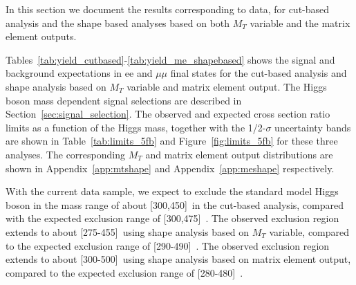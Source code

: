 In this section we document the results corresponding to \intlumi data, for 
cut-based analysis and the shape based analyses based on both 
$M_T$ variable and the matrix element outputs. 

Tables~\ref{tab:yield_cutbased}-\ref{tab:yield_me_shapebased} shows the signal and background expectations 
in ee and $\mu\mu$ final states for the cut-based analysis and shape analysis based on $M_T$ variable 
and matrix element output. The Higgs boson mass dependent signal selections are described in Section~\ref{sec:signal_selection}.
The observed and expected cross section ratio limits as a function of the Higgs mass, together with the 1/2-$\sigma$ uncertainty bands 
are shown in Table~\ref{tab:limits_5fb} and Figure~\ref{fig:limits_5fb} for these three analyses. 
The corresponding $M_T$ and matrix element output distributions are shown in Appendix~\ref{app:mtshape} and Appendix~\ref{app:meshape} respectively.

With the current data sample, we expect to exclude the standard model Higgs boson 
in the mass range of about [300,450]~\GeVcc in the cut-based analysis, compared with the 
expected exclusion range of [300,475]~\GeVcc. 
The observed exclusion region extends to about [275-455]~\GeVcc using shape analysis based on 
$M_T$ variable, compared to the expected exclusion range of [290-490]~\GeVcc.
The observed exclusion region extends to about [300-500]~\GeVcc using shape analysis based on 
matrix element output, compared to the expected exclusion range of [280-480]~\GeVcc.


